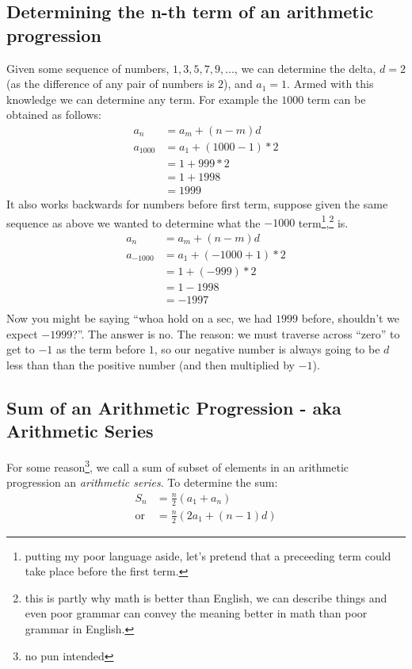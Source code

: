 \subsection{Determining the n-th term of an arithmetic progression}
\label{sec:nthTermOfAnArithmeticProgression}
Given some sequence of numbers, $1, 3, 5, 7, 9, \ldots$, we can determine the
delta, $d=2$ (as the difference of any pair of numbers is $2$), and $a_1 = 1$.
Armed with this knowledge we can determine any term. For example the
$1000$ term can be obtained as follows:
\begin{align}
  a_n &= a_m + (n-m)d \nonumber \\
  a_{1000} &= a_{1} + (1000-1)*2 \\
    &= 1 + 999*2 \\
    &= 1 + 1998 \\
    &= 1999
\end{align}
It also works backwards for numbers before first term, suppose given the same
sequence as above we wanted to determine what the $-1000$
term\footnote{putting my poor language aside, let's pretend that a preceeding
term could take place before the first term.},\tsup{,}\footnote{this is partly
why math is better than English, we can describe things and even poor grammar
can convey the meaning better in math than poor grammar in English.} is.
\begin{align}
  a_n &= a_m + (n-m)d \nonumber \\
  a_{-1000} &= a_{1} + (-1000+1)*2 \\
    &= 1 + (-999)*2 \\
    &= 1 -1998 \\
    &= -1997 \\
\end{align}
Now you might be saying ``whoa hold on a sec, we had $1999$ before, shouldn't we
expect $-1999$?''. The answer is no. The reason: we must traverse across
``zero'' to get to $-1$ as the term before $1$, so our negative number is always
going to be $d$ less than than the positive number (and then multiplied by
$-1$).
\newpage
\subsection{Sum of an Arithmetic Progression - aka Arithmetic Series}
\label{sec:ArithmeticSeries}
For some reason\footnote{no pun intended}, we call a sum of subset of elements
in an arithmetic progression an \emph{arithmetic series}. To determine the sum:
\begin{align}
  S_n
    &= \frac{n}{2}(a_1 + a_n) \label{eq:ArithmeticSum1}\\
    \text{or}
    &= \frac{n}{2}(2a_1 + (n-1)d) \label{eq:ArithmeticSum2}
\end{align}

